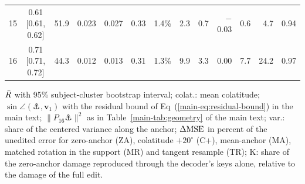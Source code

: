 \begin{table}[p]
\begin{tabular}{rcccccrrrrrrr}
15 & 0.61 [0.61, 0.62] & 51.9 & 0.023 & 0.027 & 0.33 & 1.4\% & 2.3 & 0.7 & $-$0.03 & 0.6 & 4.7 & 0.94 \\
16 & 0.71 [0.71, 0.72] & 44.3 & 0.012 & 0.013 & 0.31 & 1.3\% & 9.9 & 3.3 & 0.00 & 7.7 & 24.2 & 0.97 \\
\bottomrule
\end{tabular}
\begin{flushleft}\footnotesize $\bar{R}$ with 95\% subject-cluster bootstrap interval; colat.: mean colatitude; $\sin\angle(\anchor,\bm{v}_1)$ with the residual bound of Eq~(\ref{main-eq:residual-bound}) in the main text; $\|P_{16}\anchor\|^2$ as in Table~\ref{main-tab:geometry} of the main text; var.: share of the centered variance along the anchor; $\Delta\mathrm{MSE}$ in percent of the unedited error for zero-anchor (ZA), colatitude $+20^\circ$ (C+), mean-anchor (MA), matched rotation in the support (MR) and tangent resample (TR); K: share of the zero-anchor damage reproduced through the decoder's keys alone, relative to the damage of the full edit.\end{flushleft}
\end{table}
